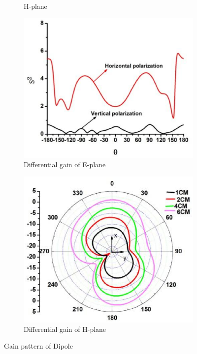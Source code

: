 \documentclass[journal]{IEEEtran}
\begin{document}
$$\begin{figure}[!htb]
\begin{subfigure}[b]{0.24\textwidth}
\caption{H-plane}
\label{fig:c}	
\end{subfigure}
\begin{subfigure}[b]{0.24\textwidth}
\includegraphics[width=\textwidth]{figs/13c.eps}
\caption{Differential gain of E-plane }
\label{fig:b}
\end{subfigure}
\begin{subfigure}[b]{0.24\textwidth}
\includegraphics[width=\textwidth]{figs/13d.eps}
\caption{Differential gain of H-plane}
\label{fig:d}	
\end{subfigure}
\caption{Gain pattern of Dipole}
\label{fig:13}
\end{figure}
\end{document}
